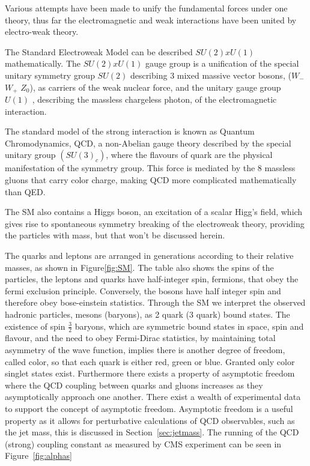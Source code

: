 Various attempts have been made to unify the fundamental forces under one theory, thus far the electromagnetic and weak interactions have been united by electro-weak theory. 

The Standard Electroweak Model can be described $SU(2) x U(1)$ mathematically.
The  $SU(2) x U(1)$ gauge group is a unification of the special unitary symmetry group $SU(2)$ describing 3 mixed massive vector bosons, ($W_{-}$ $W_{+}$ $Z_0$), as carriers of the weak nuclear force, and the unitary gauge group $U(1)$ , describing the massless chargeless photon, of the electromagnetic interaction.

The standard model of the strong interaction is known as Quantum Chromodynamics, QCD, a non-Abelian gauge theory described by the special unitary group $(SU(3)_c)$, where the flavours of quark are the physical manifestation of the symmetry group. This force is mediated by the 8 massless gluons that carry color charge, making QCD more complicated mathematically than QED.

The SM also contains a Higgs boson, an excitation of a scalar Higg's field, which gives rise to spontaneous symmetry breaking of the electroweak theory, providing the particles with mass, but that won't be discussed herein. 

The quarks and leptons are arranged in generations according to their relative masses, as shown in Figure\ref{fig:SM}. The table also shows the spins of the particles, the leptons and quarks have half-integer spin, fermions, that obey the fermi exclusion principle. Conversely, the bosons have half integer spin and therefore obey bose-einstein statistics. Through the SM we interpret the observed hadronic particles, mesons (baryons), as 2 quark (3 quark) bound states. The existence of spin $\frac{3}{2}$ baryons, which are symmetric bound states in space, spin and flavour, and the need to obey Fermi-Dirac statistics, by maintaining total asymmetry of the wave function, implies there is another degree of freedom, called color, so that each quark is either red, green or blue. Granted only color singlet states exist. Furthermore there exists a property of asymptotic freedom where the QCD coupling between quarks and gluons increases as they asymptotically approach one another. There exist a wealth of experimental data to support the concept of asymptotic freedom. Asymptotic freedom is a useful property as it allows for perturbative calculations of QCD observables, such as the jet mass, this is discussed in Section~\ref{sec:jetmass}. The running of the QCD (strong) coupling constant as measured by CMS experiment can be seen in Figure~\ref{fig:alphas}


